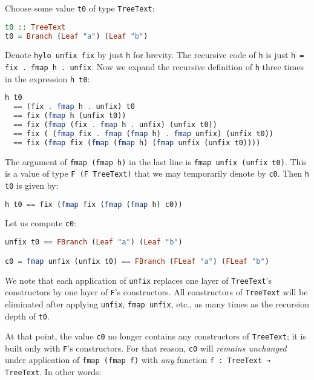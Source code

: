 Choose some value \lstinline!t0! of type \lstinline!TreeText!:


\begin{lstlisting}[language=Haskell]
t0 :: TreeText
t0 = Branch (Leaf "a") (Leaf "b")
\end{lstlisting}


Denote \lstinline!hylo unfix fix! by just \lstinline!h! for brevity.
The recursive code of \lstinline!h! is just \lstinline!h = fix . fmap h . unfix!.
Now we expand the recursive definition of \lstinline!h! three times in the expression \lstinline!h t0!:


\begin{lstlisting}[language=Haskell]
h t0
  == (fix . fmap h . unfix) t0
  == fix (fmap h (unfix t0))
  == fix (fmap (fix . fmap h . unfix) (unfix t0))
  == fix ( (fmap fix . fmap (fmap h) . fmap unfix) (unfix t0))
  == fix (fmap fix (fmap (fmap h) (fmap unfix (unfix t0))))
\end{lstlisting}


The argument of \lstinline!fmap (fmap h)! in the last line is \lstinline!fmap unfix (unfix t0)!.
This is a value of type \lstinline!F (F TreeText)! that we may temporarily denote by \lstinline!c0!.
Then \lstinline!h t0! is given by:


\begin{lstlisting}[language=Haskell]
h t0 == fix (fmap fix (fmap (fmap h) c0))
\end{lstlisting}


Let us compute \lstinline!c0!:


\begin{lstlisting}[language=Haskell]
unfix t0 == FBranch (Leaf "a") (Leaf "b")

c0 = fmap unfix (unfix t0) == FBranch (FLeaf "a") (FLeaf "b")
\end{lstlisting}


We note that each application of \lstinline!unfix! replaces one layer of \lstinline!TreeText!'s constructors by one layer of \lstinline!F!'s constructors.
All constructors of \lstinline!TreeText! will be eliminated after applying \lstinline!unfix!, \lstinline!fmap unfix!, etc., as many times as the recursion depth of \lstinline!t0!.


At that point, the value \lstinline!c0! no longer contains any constructors of \lstinline!TreeText!; it is built only with \lstinline!F!'s constructors.
For that reason, \lstinline!c0! will \emph{remains unchanged} under application of \lstinline!fmap (fmap f)! with \emph{any} function \lstinline!f : TreeText → TreeText!.
In other words:


